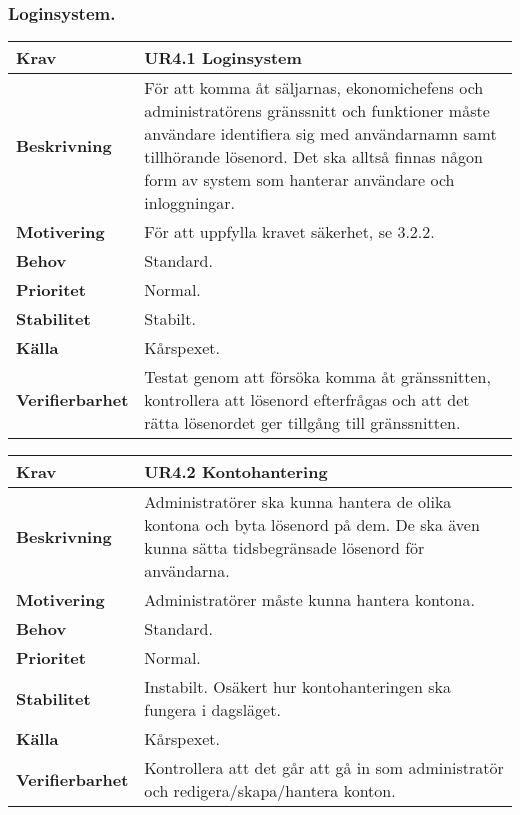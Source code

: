 \documentclass[a4paper, twoside, 11pt, titlepage]{article}
\begin{document}
		\subsubsection{Loginsystem.}


		\begin {table} [ht] \begin{tabular} { p{2.6cm} p{12.5cm} }
			\hline
			{\sffamily\textbf{Krav}} & {\sffamily\textbf{UR4.1 Loginsystem }} \\
			\hline
			{\sffamily\textbf{Beskrivning}} & {För att komma åt säljarnas, ekonomichefens och administratörens gränssnitt och funktioner måste användare identifiera sig med användarnamn samt tillhörande lösenord. Det ska alltså finnas någon form av system som hanterar användare och inloggningar.} \\
			\hline
			{\sffamily\textbf{Motivering}} & {För att uppfylla kravet säkerhet, se 3.2.2.} \\
			\hline
			{\sffamily\textbf{Behov}} & {Standard.} \\
			\hline
			{\sffamily\textbf{Prioritet}} & {Normal.} \\
			\hline
			{\sffamily\textbf{Stabilitet}} & {Stabilt.} \\
			\hline
			{\sffamily\textbf{Källa}} & {Kårspexet.} \\
			\hline
			{\sffamily\textbf{Verifierbarhet}} & {Testat genom att försöka komma åt gränssnitten, kontrollera att lösenord efterfrågas och att det rätta lösenordet ger tillgång till gränssnitten.} \\
			\hline
		\end{tabular} \end{table} \FloatBarrier
		\vspace{6mm}

		\begin {table} [ht] \begin{tabular} { p{2.6cm} p{12.5cm} }
			\hline
			{\sffamily\textbf{Krav}} & {\sffamily\textbf{UR4.2 Kontohantering }} \\
			\hline
			{\sffamily\textbf{Beskrivning}} & {Administratörer ska kunna hantera de olika kontona och byta lösenord på dem. De ska även kunna sätta tidsbegränsade lösenord för användarna.} \\
			\hline
			{\sffamily\textbf{Motivering}} & {Administratörer måste kunna hantera kontona.} \\
			\hline
			{\sffamily\textbf{Behov}} & {Standard.} \\
			\hline
			{\sffamily\textbf{Prioritet}} & {Normal.} \\
			\hline
			{\sffamily\textbf{Stabilitet}} & {Instabilt. Osäkert hur kontohanteringen ska fungera i dagsläget.} \\
			\hline
			{\sffamily\textbf{Källa}} & {Kårspexet.} \\
			\hline
			{\sffamily\textbf{Verifierbarhet}} & {Kontrollera att det går att gå in som administratör och redigera/skapa/hantera konton.} \\
			\hline
		\end{tabular} \end{table} \FloatBarrier
		\vspace{6mm}
\end{document}
